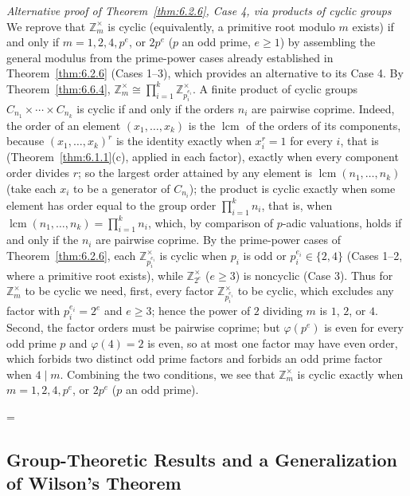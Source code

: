 \documentclass[11pt]{article}
\makeatletter
\theoremstyle{ntstyle}
\let\nt@closedisplay\]
\def\nt@guardedclose{\@ifnextchar\par{\nt@closeafterpar}{\@ifnextchar\end{\postdisplaypenalty\@M\nt@closedisplay}{\nt@closedisplay}}}
\def\nt@closeafterpar\par{\@ifnextchar\par{\nt@closeafterpar}{\@ifnextchar\end{\postdisplaypenalty\@M\nt@closedisplay\par}{\nt@closedisplay\par}}}
\renewenvironment{proof}[1][\proofname]{\par
  \pushQED{\qed}\normalfont\topsep\medskipamount\edef\nt@afterproof{\@endparpenalty=\the\@endparpenalty\relax}\@beginparpenalty\@M\@endparpenalty\@M\let\]\nt@guardedclose\trivlist\item[]\textit{#1\@addpunct{.}} \ignorespaces}{\ifvmode\addpenalty\@M\fi\popQED\nt@afterproof\endtrivlist\@endpefalse}
\newenvironment{altproof}[1][\proofname]{\begin{proof}[#1]\renewcommand{\qedsymbol}{}}{\end{proof}}
\newcommand{\ZmodUnits}[1]{\mathbb{Z}_{#1}^{\times}}
\DeclareMathOperator{\lcm}{lcm}
\makeatother
\begin{document}
\begin{altproof}[Alternative proof of Theorem~\ref{thm:6.2.6}, Case 4, via products of cyclic groups] We reprove that
	$\ZmodUnits{m}$ is cyclic (equivalently, a primitive root
	modulo $m$ exists) if and only if $m = 1, 2, 4, p^{e}$, or
	$2 p^{e}$ ($p$ an odd prime, $e \ge 1$) by assembling the general
	modulus from the prime-power cases already established in Theorem~\ref{thm:6.2.6} (Cases 1--3), which provides an alternative to its Case 4. By
	Theorem~\ref{thm:6.6.4}, $\ZmodUnits{m}
		\cong \prod_{i=1}^{k}\ZmodUnits{p_i^{e_i}}$. A finite product of cyclic groups $C_{n_1} \times \cdots \times
		C_{n_k}$ is cyclic if and only if the orders $n_i$ are pairwise
	coprime. Indeed, the order of an element $(x_1, \ldots, x_k)$ is the
	$\lcm$ of the orders of its components, because
	$(x_1,\ldots,x_k)^r$ is the identity exactly when $x_i^r=1$ for every
	$i$, that is (Theorem~\ref{thm:6.1.1}(c), applied in each factor), exactly
	when every component order divides $r$; so the largest
	order attained by any element is $\lcm(n_1, \ldots, n_k)$ (take each $x_i$ to be a generator of $C_{n_i}$); the product is
	cyclic exactly when some element has order equal to the group order
	$\prod_{i=1}^{k}n_i$, that is, when $\lcm(n_1, \ldots, n_k) =
		\prod_{i=1}^{k}n_i$, which, by comparison of $p$-adic valuations, holds if and
	only if the $n_i$ are pairwise coprime. By the prime-power cases of Theorem~\ref{thm:6.2.6}, each
	$\ZmodUnits{p_i^{e_i}}$ is cyclic when $p_i$ is odd or
	$p_i^{e_i} \in \{2, 4\}$ (Cases 1--2, where a primitive root exists),
	while $\ZmodUnits{2^{e}}$ ($e \ge 3$) is noncyclic
	(Case 3). Thus for $\ZmodUnits{m}$ to be cyclic we need,
	first, every factor $\ZmodUnits{p_i^{e_i}}$ to be cyclic,
	which excludes any factor with $p_i^{e_i} = 2^{e}$ and $e \ge 3$; hence
	the power of $2$ dividing $m$ is $1$, $2$, or $4$. Second, the factor
	orders must be pairwise coprime; but $\varphi(p^{e})$ is even for every
	odd prime $p$ and $\varphi(4) = 2$ is even, so at most one factor may
	have even order, which forbids two distinct odd prime factors and
	forbids an odd prime factor when $4 \mid m$. Combining the two
	conditions, we see that $\ZmodUnits{m}$ is cyclic exactly when $m = 1, 2,
		4, p^{e}$, or $2 p^{e}$ ($p$ an odd prime).

\end{altproof}
\subsection{Group-Theoretic Results and a Generalization of Wilson's Theorem}
\end{document}
